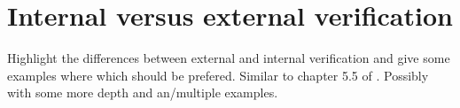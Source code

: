 \section{Internal versus external verification}\label{section:internal_vs_external_verification}
Highlight the differences between external and internal verification and give some examples where which should be prefered. 
Similar to chapter 5.5 of \cite{10.1145/2841316}. 
Possibly with some more depth and an/multiple examples.
